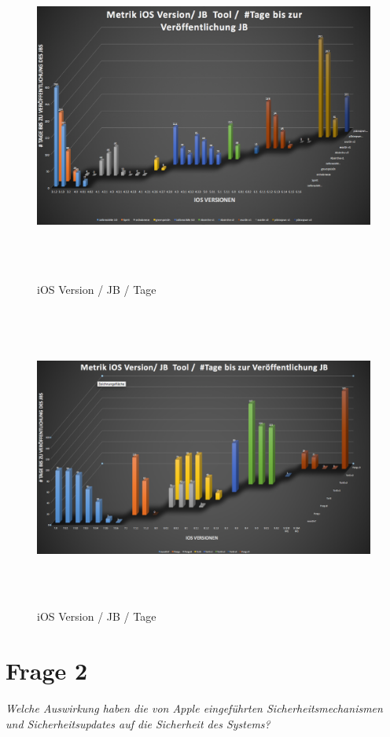          
\begin{figure}[htbp]
        \centering
                \includegraphics[height=11cm]{Bilder/Frage1_1.png}
        \caption{iOS Version / JB / Tage}
        \label{fig:AnalyseiOSJB1}        
\end{figure}

\begin{figure}[htbp]
        \centering
                \includegraphics[height=10cm]{Bilder/Frage1_2.png}
        \caption{iOS Version / JB / Tage}
        \label{fig:AnalyseiOSJB2}
\end{figure}

\section{Frage 2}
\label{sec:Frage2}
\textit{\glqq Welche Auswirkung haben die von Apple eingeführten Sicherheitsmechanismen und Sicherheitsupdates auf die Sicherheit des Systems?\grqq{}} 
            
